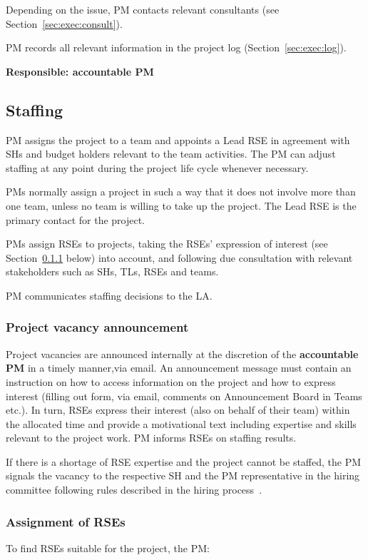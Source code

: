 Depending on the issue, PM contacts relevant consultants (see Section~\ref{sec:exec:consult}).

PM records all relevant information in the project log (Section~\ref{sec:exec:log}).

\textbf{Responsible: accountable PM}



\subsection{Staffing}
PM assigns the project to a team and appoints a Lead RSE in agreement with SHs and budget
holders relevant to the team activities. The PM can adjust staffing at any point during the project life cycle
whenever necessary.

PMs normally assign a project in such a way that it does not involve more than one team, unless no team is willing to
take up the project. The Lead RSE is the primary contact for the project.

PMs assign RSEs to projects, taking the RSEs' expression of interest (see Section~\ref{sec:init:vacancy} below) into account, and following due consultation with relevant stakeholders such as SHs,
TLs, RSEs and teams. 

PM communicates staffing decisions to the LA. 

\subsubsection{Project vacancy announcement}
\label{sec:init:vacancy}
Project vacancies are announced internally at the discretion of the \textbf{accountable PM} in a timely manner,via email. An announcement message must contain an instruction on how to access information on the project and how to
express interest (filling out form, via email, comments on Announcement Board in Teams etc.). In turn, RSEs express
their interest (also on behalf of their team) within the allocated time and provide a motivational text including
expertise and skills relevant to the project work. PM informs RSEs on staffing results.

If there is a shortage of RSE expertise and the project cannot be staffed, the PM signals the vacancy to the respective
SH and the PM representative in the hiring committee following rules described in the hiring process~\cite{hiring-intranet}.


\subsubsection{Assignment of RSEs}
To find RSEs suitable for the project, the PM:

